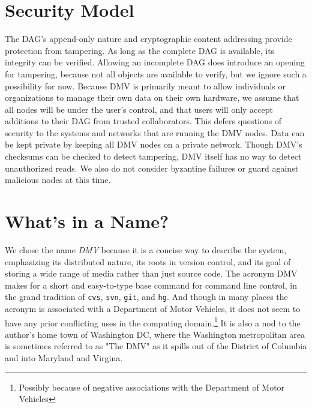 \section{Security Model}
\label{security-model}

The \gls{DAG}'s append-only nature and cryptographic content addressing provide
protection from tampering. As long as the complete \gls{DAG} is available, its
integrity can be verified. Allowing an incomplete \gls{DAG} does introduce an
opening for tampering, because not all objects are available to verify, but we
ignore such a possibility for now. Because \gls{DMV} is primarily meant to allow
individuals or organizations to manage their own data on their own hardware, we
assume that all nodes will be under the user's control, and that users will only
accept additions to their \gls{DAG} from trusted collaborators. This defers
questions of security to the systems and networks that are running the \gls{DMV}
nodes. Data can be kept private by keeping all \gls{DMV} nodes on a private
network. Though \gls{DMV}'s checksums can be checked to detect tampering,
\gls{DMV} itself has no way to detect unauthorized reads. We also do not
consider byzantine failures or guard against malicious nodes at this time.

%


\section{What's in a Name?}

We chose the name \emph{\acrlong{DMV}} because it is a concise way to describe
the system, emphasizing its distributed nature, its roots in version control,
and its goal of storing a wide range of media rather than just source code. The
acronym \gls{DMV} makes for a short and easy-to-type base command for command
line control, in the grand tradition of \lstinline{cvs}, \lstinline{svn},
\lstinline{git}, and \lstinline{hg}. And though in many places the acronym is
associated with a Department of Motor Vehicles, it does not seem to have any
prior conflicting uses in the computing domain.\footnote{Possibly because of
negative associations with the Department of Motor Vehicles} It is also a nod to
the author's home town of Washington DC, where the Washington metropolitan area
is sometimes referred to as "The DMV" as it spills out of the District of
Columbia and into Maryland and Virgina.
